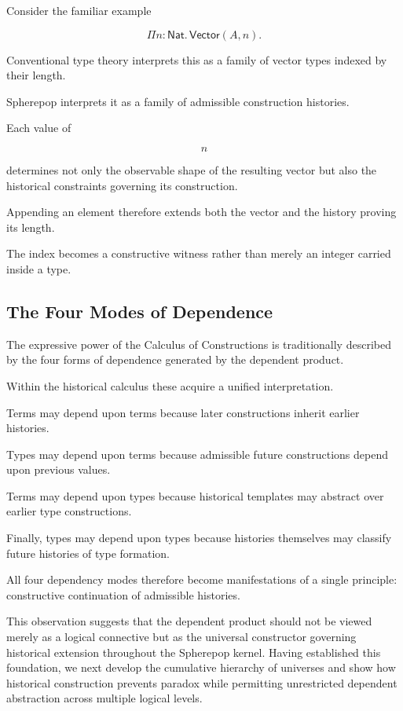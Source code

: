 \documentclass[12pt,oneside]{article}
\theoremstyle{definition}
\theoremstyle{remark}
\begin{document}
Consider the familiar example

\[
\Pi n:\mathsf{Nat}.\,
\mathsf{Vector}(A,n).
\]

Conventional type theory interprets this as a family of vector types indexed by
their length.

Spherepop interprets it as a family of admissible construction histories.

Each value of

\[
n
\]

determines not only the observable shape of the resulting vector but also the
historical constraints governing its construction.

Appending an element therefore extends both the vector and the history proving
its length.

The index becomes a constructive witness rather than merely an integer carried
inside a type.

\subsection{The Four Modes of Dependence}

The expressive power of the Calculus of Constructions is traditionally described
by the four forms of dependence generated by the dependent product.

Within the historical calculus these acquire a unified interpretation.

Terms may depend upon terms because later constructions inherit earlier
histories.

Types may depend upon terms because admissible future constructions depend upon
previous values.

Terms may depend upon types because historical templates may abstract over
earlier type constructions.

Finally, types may depend upon types because histories themselves may classify
future histories of type formation.

All four dependency modes therefore become manifestations of a single principle:
constructive continuation of admissible histories.

This observation suggests that the dependent product should not be viewed merely
as a logical connective but as the universal constructor governing historical
extension throughout the Spherepop kernel. Having established this foundation,
we next develop the cumulative hierarchy of universes and show how historical
construction prevents paradox while permitting unrestricted dependent
abstraction across multiple logical levels.
\end{document}
